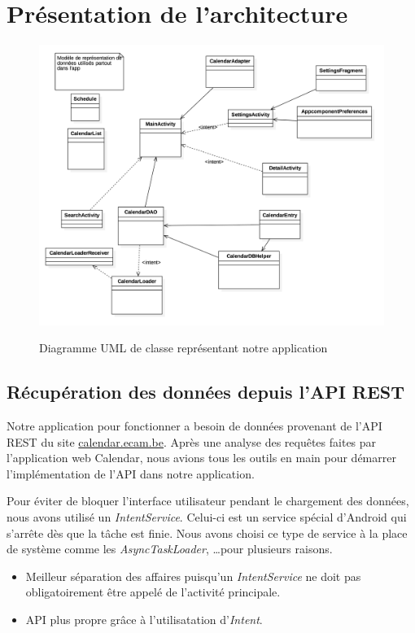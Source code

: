 \documentclass{article}
\begin{document}
	\section{Présentation de l'architecture}
        \begin{figure}
            \centering
            \includegraphics[scale=0.2]{img/uml.png}
            \label{fig:uml}
            \caption{Diagramme UML de classe représentant notre application}
        \end{figure}

        \subsection{Récupération des données depuis l'API REST}
            Notre application pour fonctionner a besoin de données provenant de l'API REST du site
            \url{calendar.ecam.be}. Après une analyse des requêtes faites par l'application web
            Calendar, nous avions tous les outils en main pour démarrer l'implémentation de l'API
            dans notre application.

            Pour éviter de bloquer l'interface utilisateur pendant le chargement des données, nous
            avons utilisé un \textit{IntentService}. Celui-ci est un service spécial d'Android qui
            s'arrête dès que la tâche est finie. Nous avons choisi ce type de service à la place de
            système comme les \textit{AsyncTaskLoader}, \ldots pour plusieurs raisons.
            \begin{itemize}
                \item Meilleur séparation des affaires puisqu'un \textit{IntentService} ne doit pas
                    obligatoirement être appelé de l'activité principale.
                \item API plus propre grâce à l'utilisatation d'\textit{Intent}.
            \end{itemize}
\end{document}
